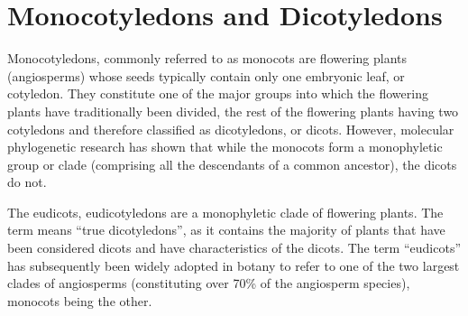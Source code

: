 \documentclass[]{book}
\begin{document}
\hypertarget{monocotyledons-and-dicotyledons}{%
\section{Monocotyledons and Dicotyledons}\label{monocotyledons-and-dicotyledons}}

Monocotyledons, commonly referred to as monocots are flowering plants (angiosperms) whose seeds typically contain only one embryonic leaf, or cotyledon. They constitute one of the major groups into which the flowering plants have traditionally been divided, the rest of the flowering plants having two cotyledons and therefore classified as dicotyledons, or dicots. However, molecular phylogenetic research has shown that while the monocots form a monophyletic group or clade (comprising all the descendants of a common ancestor), the dicots do not.

The eudicots, eudicotyledons are a monophyletic clade of flowering plants. The term means ``true dicotyledons'', as it contains the majority of plants that have been considered dicots and have characteristics of the dicots. The term ``eudicots'' has subsequently been widely adopted in botany to refer to one of the two largest clades of angiosperms (constituting over 70\% of the angiosperm species), monocots being the other.
\end{document}
